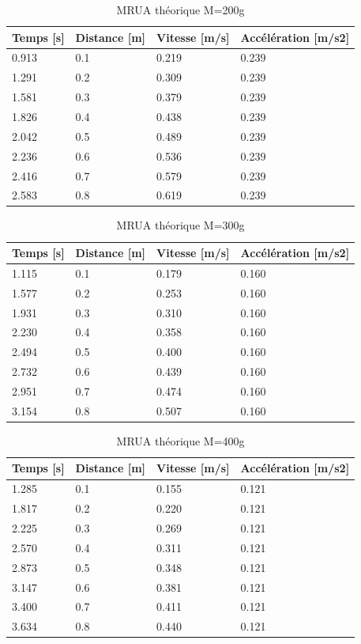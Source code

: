 \begin{table}[ht]
    \centering
    \caption[MRUA théorique M=200g]{MRUA théorique M=200g}
    \begin{tabular}{|l|l|l|l|}
	\hline
	Temps [s]	&Distance [m]	&Vitesse [m/s]	&Accélération [m/s2]\\
	\hline
	0.913	&0.1	&0.219	&0.239 \\
	1.291	&0.2	&0.309	&0.239 \\
	1.581	&0.3	&0.379	&0.239 \\
	1.826	&0.4	&0.438	&0.239 \\
	2.042	&0.5	&0.489	&0.239 \\
	2.236	&0.6	&0.536	&0.239 \\
	2.416	&0.7	&0.579	&0.239 \\
	2.583	&0.8	&0.619	&0.239 \\
	\hline
    \end{tabular}
\end{table}

\begin{table}[ht]
    \centering
    \caption[MRUA théorique M=300g]{MRUA théorique M=300g}
    \begin{tabular}{|l|l|l|l|}
	\hline
	Temps [s]	&Distance [m]	&Vitesse [m/s]	&Accélération [m/s2]\\
	\hline
	1.115	&0.1	&0.179	&0.160 \\
	1.577	&0.2	&0.253	&0.160 \\
	1.931	&0.3	&0.310	&0.160 \\
	2.230	&0.4	&0.358	&0.160 \\
	2.494	&0.5	&0.400	&0.160 \\
	2.732	&0.6	&0.439	&0.160 \\
	2.951	&0.7	&0.474	&0.160 \\
	3.154	&0.8	&0.507	&0.160 \\
	\hline
    \end{tabular}
\end{table}

\begin{table}[ht]
    \centering
    \caption[MRUA théorique M=400g]{MRUA théorique M=400g}
    \begin{tabular}{|l|l|l|l|}
	\hline
	Temps [s]	&Distance [m]	&Vitesse [m/s]	&Accélération [m/s2]\\
	\hline
	1.285	&0.1	&0.155	&0.121\\
	1.817	&0.2	&0.220	&0.121\\
	2.225	&0.3	&0.269	&0.121\\
	2.570	&0.4	&0.311	&0.121\\
	2.873	&0.5	&0.348	&0.121\\
	3.147	&0.6	&0.381	&0.121\\
	3.400	&0.7	&0.411	&0.121\\
	3.634	&0.8	&0.440	&0.121\\
	\hline
    \end{tabular}
\end{table}

